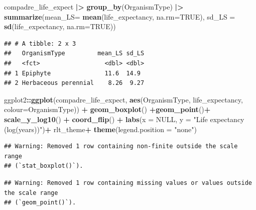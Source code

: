 \documentclass[
]{book}
\newenvironment{Shaded}{\begin{snugshade}}{\end{snugshade}}
\newcommand{\AttributeTok}[1]{\textcolor[rgb]{0.13,0.29,0.53}{#1}}
\newcommand{\ConstantTok}[1]{\textcolor[rgb]{0.56,0.35,0.01}{#1}}
\newcommand{\FunctionTok}[1]{\textcolor[rgb]{0.13,0.29,0.53}{\textbf{#1}}}
\newcommand{\NormalTok}[1]{#1}
\newcommand{\SpecialCharTok}[1]{\textcolor[rgb]{0.81,0.36,0.00}{\textbf{#1}}}
\newcommand{\StringTok}[1]{\textcolor[rgb]{0.31,0.60,0.02}{#1}}
\theoremstyle{definition}
\theoremstyle{definition}
\theoremstyle{definition}
\theoremstyle{definition}
\theoremstyle{remark}
\begin{document}
\begin{Shaded}
\begin{Highlighting}[]
\NormalTok{compadre\_life\_expect }\SpecialCharTok{|\textgreater{}} 
  \FunctionTok{group\_by}\NormalTok{(OrganismType) }\SpecialCharTok{|\textgreater{}} 
  \FunctionTok{summarize}\NormalTok{(}\AttributeTok{mean\_LS=} \FunctionTok{mean}\NormalTok{(life\_expectancy, }\AttributeTok{na.rm=}\ConstantTok{TRUE}\NormalTok{),}
            \AttributeTok{sd\_LS =} \FunctionTok{sd}\NormalTok{(life\_expectancy, }\AttributeTok{na.rm=}\ConstantTok{TRUE}\NormalTok{))}
\end{Highlighting}
\end{Shaded}

\begin{verbatim}
## # A tibble: 2 x 3
##   OrganismType         mean_LS sd_LS
##   <fct>                  <dbl> <dbl>
## 1 Epiphyte               11.6  14.9 
## 2 Herbaceous perennial    8.26  9.27
\end{verbatim}

\begin{Shaded}
\begin{Highlighting}[]
\NormalTok{ggplot2}\SpecialCharTok{::}\FunctionTok{ggplot}\NormalTok{(compadre\_life\_expect, }\FunctionTok{aes}\NormalTok{(OrganismType, life\_expectancy, }\AttributeTok{colour=}\NormalTok{OrganismType)) }\SpecialCharTok{+}
  \FunctionTok{geom\_boxplot}\NormalTok{() }\SpecialCharTok{+}\FunctionTok{geom\_point}\NormalTok{()}\SpecialCharTok{+}
  \FunctionTok{scale\_y\_log10}\NormalTok{() }\SpecialCharTok{+}
  \FunctionTok{coord\_flip}\NormalTok{() }\SpecialCharTok{+}
  \FunctionTok{labs}\NormalTok{(}\AttributeTok{x =} \ConstantTok{NULL}\NormalTok{, }\AttributeTok{y =} \StringTok{"Life expectancy (log(years))"}\NormalTok{)}\SpecialCharTok{+}
\NormalTok{  rlt\_theme}\SpecialCharTok{+}
  \FunctionTok{theme}\NormalTok{(}\AttributeTok{legend.position =} \StringTok{"none"}\NormalTok{)}
\end{Highlighting}
\end{Shaded}

\begin{verbatim}
## Warning: Removed 1 row containing non-finite outside the scale range
## (`stat_boxplot()`).
\end{verbatim}

\begin{verbatim}
## Warning: Removed 1 row containing missing values or values outside the scale range
## (`geom_point()`).
\end{verbatim}
\end{document}
